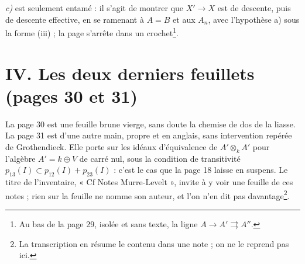 \documentclass[11pt,a4paper]{article}
\begin{document}
\emph{c)} est seulement entamé : il s'agit de montrer que $X' \to X$ est de
descente, puis de descente effective, en se ramenant à $A = B$ et aux $A_n$,
avec l'hypothèse a) sous la forme (iii) ; la page s'arrête dans un
crochet\footnote{Au bas de la page 29, isolée et sans texte, la ligne $A \to
A' \rightrightarrows A''$.}.

\section*{IV. Les deux derniers feuillets (pages 30 et 31)}

La page 30 est une feuille brune vierge, sans doute la chemise de dos de la
liasse. La page 31 est d'une autre main, propre et en anglais, sans
intervention repérée de Grothendieck. Elle porte sur les idéaux
d'équivalence de $A' \otimes_k A'$ pour l'algèbre $A' = k \oplus V$ de carré
nul, sous la condition de transitivité $p_{13}(I) \subset p_{12}(I) +
p_{23}(I)$ : c'est le cas que la page 18 laisse en suspens. Le titre de
l'inventaire, « Cf Notes Murre-Levelt », invite à y voir une feuille de ces
notes ; rien sur la feuille ne nomme son auteur, et l'on n'en dit pas
davantage\footnote{La transcription en résume le contenu dans une note ; on ne
le reprend pas ici.}.
\end{document}
